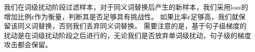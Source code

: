 

我们在词级扰动阶段过滤样本，对于同义词替换后产生的新样本，我们采用loss的增加比例ε作为衡量，判断其是否足够具有挑战性。
如果比率ε足够高，我们就保留该同义词替换，否则我们丢弃同义词替换。
需要注意的是，基于句子级梯度的扰动是在词级扰动阶段之后进行的，无论我们是否放弃单词级扰动，句子级的梯度攻击都会保留。








% 



